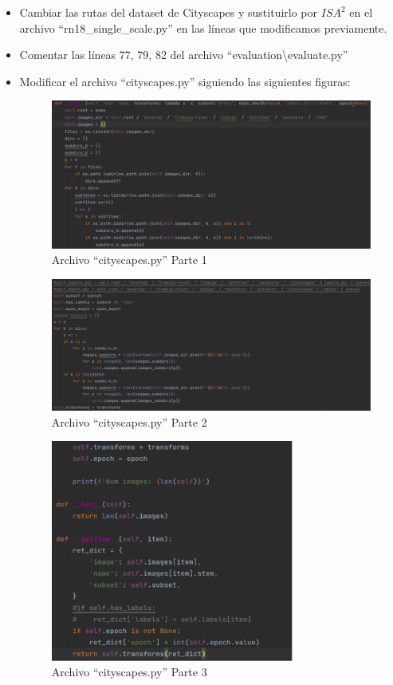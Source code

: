 \begin{itemize}
\item Cambiar las rutas del dataset de Cityscapes y sustituirlo por $ISA^{2}$ en el archivo ``rn18\_single\_scale.py'' en las líneas que modificamos previamente.
\item Comentar las líneas 77, 79, 82 del archivo ``evaluation\textbackslash{evaluate.py}''
\item Modificar el archivo ``cityscapes.py'' siguiendo las siguientes figuras:

\begin{figure}[H]
  \centering
  \includegraphics[width=16cm]{Figuras/cityscapes.py_1.eps}
  \caption{Archivo ``cityscapes.py'' Parte 1}
\end{figure}

\begin{figure}[H]
  \centering
  \includegraphics[width=16cm]{Figuras/cityscapes.py_2.eps}
  \caption{Archivo ``cityscapes.py'' Parte 2}
\end{figure}

\begin{figure}[H]
  \centering
  \includegraphics[width=8cm]{Figuras/cityscapes.py_3.eps}
  \caption{Archivo ``cityscapes.py'' Parte 3}
  \label{fig:pred.py3}
\end{figure}


\end{itemize}
